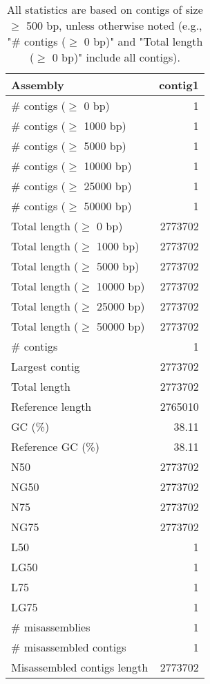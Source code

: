 \documentclass[12pt,a4paper]{article}
\begin{document}
\begin{table}[ht]
\begin{center}
\caption{All statistics are based on contigs of size $\geq$ 500 bp, unless otherwise noted (e.g., "\# contigs ($\geq$ 0 bp)" and "Total length ($\geq$ 0 bp)" include all contigs).}
\begin{tabular}{|l*{1}{|r}|}
\hline
Assembly & contig1 \\ \hline
\# contigs ($\geq$ 0 bp) & 1 \\ \hline
\# contigs ($\geq$ 1000 bp) & 1 \\ \hline
\# contigs ($\geq$ 5000 bp) & 1 \\ \hline
\# contigs ($\geq$ 10000 bp) & 1 \\ \hline
\# contigs ($\geq$ 25000 bp) & 1 \\ \hline
\# contigs ($\geq$ 50000 bp) & 1 \\ \hline
Total length ($\geq$ 0 bp) & 2773702 \\ \hline
Total length ($\geq$ 1000 bp) & 2773702 \\ \hline
Total length ($\geq$ 5000 bp) & 2773702 \\ \hline
Total length ($\geq$ 10000 bp) & 2773702 \\ \hline
Total length ($\geq$ 25000 bp) & 2773702 \\ \hline
Total length ($\geq$ 50000 bp) & 2773702 \\ \hline
\# contigs & 1 \\ \hline
Largest contig & 2773702 \\ \hline
Total length & 2773702 \\ \hline
Reference length & 2765010 \\ \hline
GC (\%) & 38.11 \\ \hline
Reference GC (\%) & 38.11 \\ \hline
N50 & 2773702 \\ \hline
NG50 & 2773702 \\ \hline
N75 & 2773702 \\ \hline
NG75 & 2773702 \\ \hline
L50 & 1 \\ \hline
LG50 & 1 \\ \hline
L75 & 1 \\ \hline
LG75 & 1 \\ \hline
\# misassemblies & 1 \\ \hline
\# misassembled contigs & 1 \\ \hline
Misassembled contigs length & 2773702 \\ \hline

\end{tabular}
\end{center}
\end{table}
\end{document}
